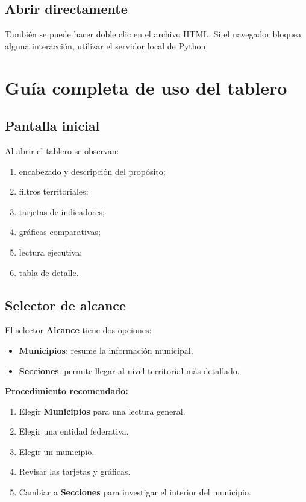 \documentclass[11pt,a4paper]{article}
\begin{document}
\subsection{Abrir directamente}

También se puede hacer doble clic en el archivo HTML. Si el navegador bloquea alguna interacción, utilizar el servidor local de Python.

\section{Guía completa de uso del tablero}

\subsection{Pantalla inicial}

Al abrir el tablero se observan:

\begin{enumerate}
    \item encabezado y descripción del propósito;
    \item filtros territoriales;
    \item tarjetas de indicadores;
    \item gráficas comparativas;
    \item lectura ejecutiva;
    \item tabla de detalle.
\end{enumerate}

\subsection{Selector de alcance}

El selector \textbf{Alcance} tiene dos opciones:

\begin{itemize}
    \item \textbf{Municipios}: resume la información municipal.
    \item \textbf{Secciones}: permite llegar al nivel territorial más detallado.
\end{itemize}

\textbf{Procedimiento recomendado:}

\begin{enumerate}
    \item Elegir \textbf{Municipios} para una lectura general.
    \item Elegir una entidad federativa.
    \item Elegir un municipio.
    \item Revisar las tarjetas y gráficas.
    \item Cambiar a \textbf{Secciones} para investigar el interior del municipio.
\end{enumerate}
\end{document}
